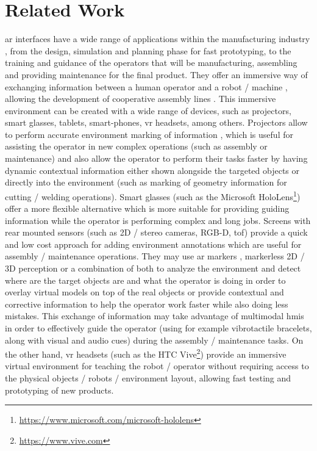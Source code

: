 \section{Related Work}\label{sec:related-work}

\gls{ar} interfaces \cite{Bimber2005} have a wide range of applications within the manufacturing industry \cite{Nee2012,Wang2016}, from the design, simulation \cite{WangOng2016} and planning phase for fast prototyping, to the training \cite{Gorecky2011} and guidance \cite{Webel2011,Gavish2015} of the operators that will be manufacturing, assembling and providing maintenance for the final product. They offer an immersive way of exchanging information between a human operator and a robot / machine \cite{Kollatsch2014,Gaschler2014,Dini2015,Michalos2016}, allowing the development of cooperative assembly lines \cite{Lenz2011,Michalos2014,Makris2016}. This immersive environment can be created with a wide range of devices, such as projectors, smart glasses, tablets, smart-phones, \gls{vr} headsets, among others. Projectors allow to perform accurate environment marking of information \cite{Tan2013,Fujimoto2014}, which is useful for assisting the operator in new complex operations (such as assembly or maintenance) and also allow the operator to perform their tasks faster by having dynamic contextual information either shown alongside the targeted objects or directly into the environment (such as marking of geometry information for cutting / welding operations). Smart glasses (such as the Microsoft HoloLens\footnote{\url{https://www.microsoft.com/microsoft-hololens}}) offer a more flexible alternative which is more suitable for providing guiding information while the operator is performing complex and long jobs. Screens with rear mounted sensors (such as 2D / stereo cameras, RGB-D, \gls{tof}) provide a quick and low cost approach for adding environment annotations which are useful for assembly / maintenance operations. They may use \gls{ar} markers \cite{Siltanen2012}, markerless 2D / 3D perception \cite{Andreopoulos2013,Guo2014} or a combination of both \cite{Wang2009} to analyze the environment and detect where are the target objects are and what the operator is doing \cite{Bannat2008} in order to overlay virtual models on top of the real objects or provide contextual and corrective information to help the operator work faster while also doing less mistakes. This exchange of information may take advantage of multimodal \glspl{hmi} \cite{Webel2013} in order to effectively guide the operator (using for example vibrotactile bracelets, along with visual and audio cues) during the assembly / maintenance tasks. On the other hand, \gls{vr} headsets (such as the HTC Vive\footnote{\url{https://www.vive.com}}) provide an immersive virtual environment for teaching the robot / operator without requiring access to the physical objects / robots / environment layout, allowing fast testing and prototyping of new products.
